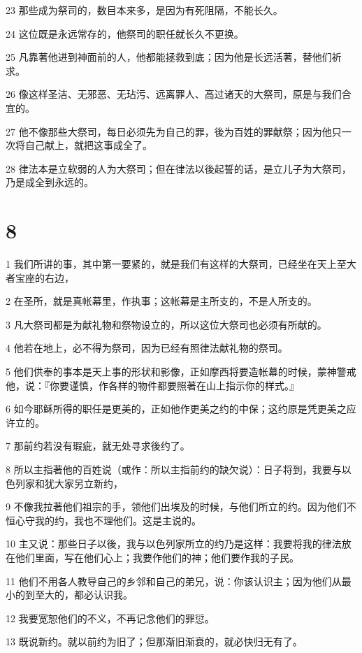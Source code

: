 \par 23 那些成为祭司的，数目本来多，是因为有死阻隔，不能长久。
\par 24 这位既是永远常存的，他祭司的职任就长久不更换。
\par 25 凡靠著他进到神面前的人，他都能拯救到底；因为他是长远活著，替他们祈求。
\par 26 像这样圣洁、无邪恶、无玷污、远离罪人、高过诸天的大祭司，原是与我们合宜的。
\par 27 他不像那些大祭司，每日必须先为自己的罪，後为百姓的罪献祭；因为他只一次将自己献上，就把这事成全了。
\par 28 律法本是立软弱的人为大祭司；但在律法以後起誓的话，是立儿子为大祭司，乃是成全到永远的。

\chapter{8}

\par 1 我们所讲的事，其中第一要紧的，就是我们有这样的大祭司，已经坐在天上至大者宝座的右边，
\par 2 在圣所，就是真帐幕里，作执事；这帐幕是主所支的，不是人所支的。
\par 3 凡大祭司都是为献礼物和祭物设立的，所以这位大祭司也必须有所献的。
\par 4 他若在地上，必不得为祭司，因为已经有照律法献礼物的祭司。
\par 5 他们供奉的事本是天上事的形状和影像，正如摩西将要造帐幕的时候，蒙神警戒他，说：『你要谨慎，作各样的物件都要照著在山上指示你的样式。』
\par 6 如今耶稣所得的职任是更美的，正如他作更美之约的中保；这约原是凭更美之应许立的。
\par 7 那前约若没有瑕疵，就无处寻求後约了。
\par 8 所以主指著他的百姓说（或作：所以主指前约的缺欠说）：日子将到，我要与以色列家和犹大家另立新约，
\par 9 不像我拉著他们祖宗的手，领他们出埃及的时候，与他们所立的约。因为他们不恒心守我的约，我也不理他们。这是主说的。
\par 10 主又说：那些日子以後，我与以色列家所立的约乃是这样：我要将我的律法放在他们里面，写在他们心上；我要作他们的神；他们要作我的子民。
\par 11 他们不用各人教导自己的乡邻和自己的弟兄，说：你该认识主；因为他们从最小的到至大的，都必认识我。
\par 12 我要宽恕他们的不义，不再记念他们的罪愆。
\par 13 既说新约。就以前约为旧了；但那渐旧渐衰的，就必快归无有了。


